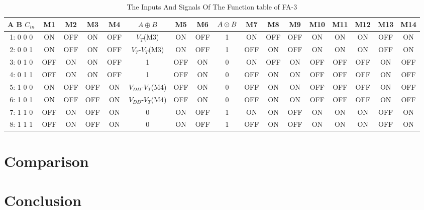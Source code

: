 \documentclass[conference]{IEEEtran}
\begin{document}
\begin{table}[!ht]
	\renewcommand{\arraystretch}{1.3}
	\caption{The Inputs And Signals Of The Function table of FA-3}
	\centering
	\begin{tabular}{ c *{16}{c}}
		\hline
		A B \(C_{in}\) & M1  & M2  & M3  & M4  & \(A \oplus B\)         & M5  & M6  & \(A \varodot B\) & M7  & M8  & M9  & M10 & M11 & M12 & M13 & M14 \\
		\hline
		1: 0 0 0       & ON  & OFF & ON  & OFF & \(V_{T}\)(M3)          & ON  & OFF & 1                & ON  & OFF & OFF & ON  & ON  & ON  & OFF & ON  \\
		2: 0 0 1       & ON  & OFF & ON  & OFF & \(V_{T}\)-\(V_T\)(M3)  & ON  & OFF & 1                & OFF & ON  & OFF & ON  & ON  & ON  & OFF & ON  \\
		3: 0 1 0       & OFF & ON  & ON  & OFF & 1                      & OFF & ON  & 0                & ON  & OFF & ON  & OFF & OFF & OFF & ON  & OFF \\
		4: 0 1 1       & OFF & ON  & ON  & OFF & 1                      & OFF & ON  & 0                & OFF & ON  & ON  & OFF & OFF & OFF & ON  & OFF \\
		5: 1 0 0       & ON  & OFF & OFF & ON  & \(V_{DD}\)-\(V_T\)(M4) & OFF & ON  & 0                & OFF & ON  & ON  & OFF & OFF & OFF & ON  & OFF \\
		6: 1 0 1       & ON  & OFF & OFF & ON  & \(V_{DD}\)-\(V_T\)(M4) & OFF & ON  & 0                & OFF & ON  & ON  & OFF & OFF & OFF & ON  & OFF \\
		7: 1 1 0       & OFF & ON  & OFF & ON  & 0                      & ON  & OFF & 1                & ON  & ON  & OFF & ON  & ON  & ON  & OFF & ON  \\
		8: 1 1 1       & OFF & ON  & OFF & ON  & 0                      & ON  & OFF & 1                & OFF & ON  & OFF & ON  & ON  & ON  & OFF & ON  \\
		\hline
	\end{tabular}
	\label{tb:fa3-func-pattern-in}
\end{table}

\newpage

\section{Comparison}
\label{sec:5}



\section{Conclusion}
\label{sec:6}
\end{document}
